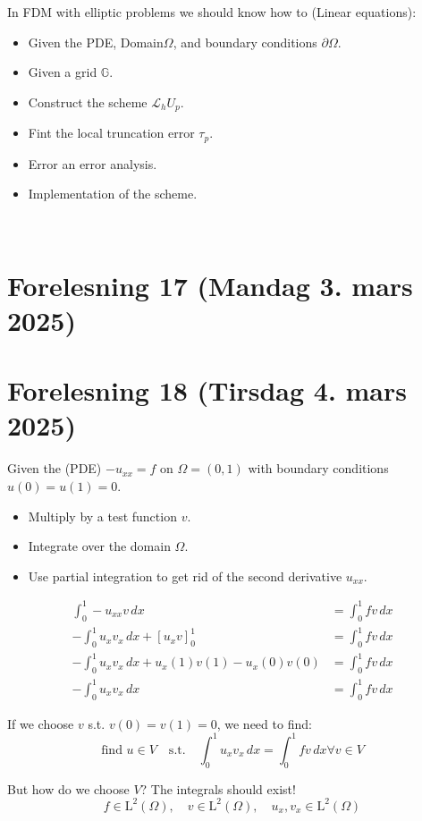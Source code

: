 In FDM with elliptic problems we should know how to (Linear equations):
\begin{itemize}
  \item Given the PDE, Domain\(\Omega\), and boundary conditions \(\partial\Omega\).
  \item Given a grid \(\mathbb{G}\).
  \item Construct the scheme \(\mathcal{L}_h U_p\).
  \item Fint the local truncation error \(\tau_p\).
  \item Error an error analysis.
  \item Implementation of the scheme.
\end{itemize}

\
\section{Forelesning 17 (Mandag 3. mars 2025) \texorpdfstring{\color{red}{Ikke møtt}}{Ikke møtt}}
\section{Forelesning 18 (Tirsdag 4. mars 2025)}
Given the (PDE) \(-u_{xx} = f\) on \(\Omega = (0,1)\) with boundary conditions \(u(0) = u(1) = 0\).
\begin{itemize}
  \item Multiply by a test function \(v\).
  \item Integrate over the domain \(\Omega\).
  \item Use partial integration to get rid of the second derivative \(u_{xx}\).
\end{itemize}
\begin{align*}
  \int_0^1 -u_{xx} v \,dx                          & = \int_0^1 f v \,dx \\
  -\int_0^1 u_x v_x \,dx + [u_x v]_0^1             & = \int_0^1 f v \,dx \\
  -\int_0^1 u_x v_x \,dx + u_x(1)v(1) - u_x(0)v(0) & = \int_0^1 f v \,dx \\
  -\int_0^1 u_x v_x \,dx                           & = \int_0^1 f v \,dx
\end{align*}

If we choose \(v\) s.t. \(v(0) = v(1) = 0\), we need to find:
\[
  \boxed{\text{find } u\in V \quad \text{s.t.} \quad \int_0^1 u_x v_x \,dx = \int_0^1 f v \,dx \forall v\in V}
\]

But how do we choose \(V\)? The integrals should exist!
\[
  f \in \mathrm{L}^2(\Omega), \quad v \in \mathrm{L}^2(\Omega), \quad u_x, v_x \in \mathrm{L}^2(\Omega)
\]

